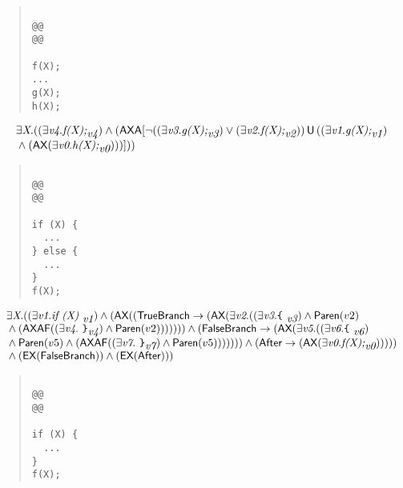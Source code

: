 \documentclass{article}
\newcommand{\U}{\,\mbox{\sf{U}}\,}
\newcommand{\A}{\mbox{\sf{A}}}
\newcommand{\AX}{\mbox{\sf{AX}}}
\newcommand{\EX}{\mbox{\sf{EX}}}
\newcommand{\AF}{\mbox{\sf{AF}}}
\newcommand{\mita}[1]{\mbox{\it{{#1}}}}
\newcommand{\msf}[1]{\mbox{\sf{{#1}}}}
\newcommand{\ttlb}{\mbox{\tt \char'173}}
\newcommand{\ttrb}{\mbox{\tt \char'175}}
\begin{document}
\begin{quote}\begin{verbatim}

@@
@@

f(X);
...
g(X);
h(X);
\end{verbatim}\end{quote}

\[\begin{array}{l}
\exists \mita{X} . ((\exists \mita{v4} . \mita{f(X);}_{\mita{v4}}) \wedge (\AX\A[\neg ((\exists \mita{v3} . \mita{g(X);}_{\mita{v3}}) \vee (\exists \mita{v2} . \mita{f(X);}_{\mita{v2}})) \U ((\exists \mita{v1} . \mita{g(X);}_{\mita{v1}})\\\mbox{} \wedge (\AX(\exists \mita{v0} . \mita{h(X);}_{\mita{v0}})))]
))
\end{array}\]

\begin{quote}\begin{verbatim}

@@
@@

if (X) {
  ...
} else {
  ...
}
f(X);
\end{verbatim}\end{quote}

\[\begin{array}{l}
\exists \mita{X} . ((\exists \mita{v1} . \mita{if (X) }_{\mita{v1}}) \wedge (\AX((\msf{TrueBranch} \rightarrow (\AX(\exists \mita{v2} . ((\exists \mita{v3} . \mita{{\ttlb}
  }_{\mita{v3}}) \wedge \msf{Paren}(v2)\\\mbox{} \wedge (\AX\AF((\exists \mita{v4} . \mita{
{\ttrb}}_{\mita{v4}}) \wedge \msf{Paren}(v2))))))) \wedge (\msf{FalseBranch} \rightarrow (\AX(\exists \mita{v5} . ((\exists \mita{v6} . \mita{{\ttlb}
  }_{\mita{v6}})\\\mbox{} \wedge \msf{Paren}(v5) \wedge (\AX\AF((\exists \mita{v7} . \mita{
{\ttrb}}_{\mita{v7}}) \wedge \msf{Paren}(v5))))))) \wedge (\msf{After} \rightarrow (\AX(\exists \mita{v0} . \mita{f(X);}_{\mita{v0}})))))\\\mbox{} \wedge (\EX(\msf{FalseBranch})) \wedge (\EX(\msf{After})))
\end{array}\]

\begin{quote}\begin{verbatim}

@@
@@

if (X) {
  ...
}
f(X);
\end{verbatim}\end{quote}
\end{document}
